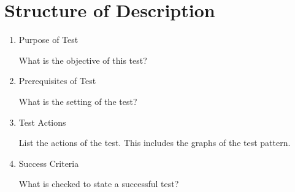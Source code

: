 \documentclass[12pt,a4paper]{report}
\begin{document}
\section{Structure of Description}
\begin{enumerate}
  \item Purpose of Test

  What is the objective of this test?
  \item Prerequisites of Test

  What is the setting of the test?
  \item Test Actions

  List the actions of the test. This includes the graphs of the test pattern.
  \item Success Criteria

  What is checked to state a successful test?
\end{enumerate}
\end{document}
